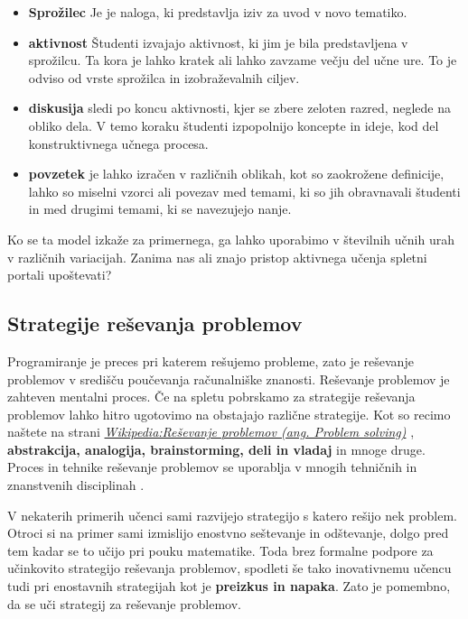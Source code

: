 \begin{itemize}
\tightlist
\item \textbf{Sprožilec} Je je naloga, ki predstavlja iziv za uvod v novo
tematiko. 
\item \textbf{aktivnost} Študenti izvajajo aktivnost, ki jim je bila
predstavljena v sprožilcu. Ta kora je lahko kratek ali lahko
zavzame večju del učne ure. To je odviso od vrste sprožilca in
izobraževalnih ciljev.
\item \textbf{diskusija} sledi po koncu aktivnosti, kjer se zbere zeloten
razred, neglede na obliko dela. V temo koraku študenti izpopolnijo
koncepte in ideje, kod del konstruktivnega učnega procesa.
\item \textbf{povzetek} je lahko izračen v različnih oblikah, kot so
zaokrožene definicije, lahko so miselni vzorci ali povezav med
temami, ki so jih obravnavali študenti in med drugimi temami, ki se
navezujejo nanje.
\end{itemize}

Ko se ta model izkaže za primernega, ga lahko uporabimo v številnih
učnih urah v različnih variacijah. Zanima nas ali znajo pristop
aktivnega učenja spletni portali upoštevati? 

\subsection{Strategije reševanja problemov}
\label{sec:strategije_reševanja_problemov}

Programiranje je preces pri katerem rešujemo probleme, zato je
reševanje problemov v središču poučevanja računalniške
znanosti. Reševanje problemov je zahteven mentalni proces. Če na
spletu pobrskamo za strategije reševanja problemov lahko hitro
ugotovimo na obstajajo različne strategije. Kot so recimo naštete na
strani
\href{https://en.wikipedia.org/wiki/Problem_solving#Problem-solving_strategies}{\emph{Wikipedia:Reševanje
    problemov (ang. Problem solving)}} \cite{wiki:problems}, \textbf{abstrakcija, analogija,
brainstorming, deli in vladaj} in mnoge druge.  Proces in tehnike
reševanje problemov se uporablja v mnogih tehničnih in znanstvenih
disciplinah \cite{guideTCS}.

V nekaterih primerih učenci sami razvijejo strategijo s katero rešijo
nek problem. Otroci si na primer sami izmislijo enostvno seštevanje in
odštevanje, dolgo pred tem kadar se to učijo pri pouku
matematike. Toda brez formalne podpore za učinkovito strategijo
reševanja problemov, spodleti še tako inovativnemu učencu tudi pri
enostavnih strategijah kot je \textbf{preizkus in napaka}. Zato je
pomembno, da se uči strategij za reševanje problemov.

